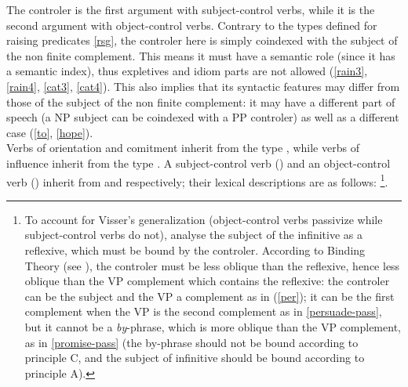 \documentclass[output=paper
                ,modfonts
                ,nonflat
	        ,collection
	        ,collectionchapter
	        ,collectiontoclongg
 	        ,biblatex
                ,babelshorthands
                ,newtxmath
                ,draftmode
                ,colorlinks, citecolor=brown
]{./langsci/langscibook}
\begin{document}
The controler is the first argument with subject-control verbs, while it is the second argument with object-control verbs. Contrary to the types defined for raising predicates \ref{rsg}, the controler here is simply coindexed with the subject of the non finite complement. This means it must have a semantic role (since it has a semantic index), thus expletives and idiom parts are not allowed (\ref{rain3}, \ref{rain4}, \ref{cat3}, \ref{cat4}). This also implies that its syntactic features may differ from those of the subject of the non finite complement: it may have a different part of speech (a NP subject can be coindexed with a PP controler) as well as a different case (\ref{to}, \ref{hope}).\\
Verbs of orientation and comitment inherit from the type , while verbs of influence inherit from the type .
A subject-control verb () and an object-control verb () inherit from  and  respectively; their lexical descriptions are as follows:
\footnote{To account for Visser's generalization (object-control verbs passivize  while subject-control verbs do not), \citet{SagandPollard1991} analyse the subject of the infinitive as a reflexive, which must be bound by the controler. According to Binding Theory (see ), the controler must be less oblique than the reflexive, hence less oblique than the VP complement which contains the reflexive: the controler can be the subject and the VP a complement as in (\ref{per}); it can be the first complement when the VP is the second complement as in \ref{persuade-pass}, but it cannot be a  \emph{by}-phrase, which is more oblique than the VP complement, as in \ref{promise-pass} (the by-phrase should not be bound according to principle C, and the subject of infinitive should be bound according to principle A).}.
\end{document}
